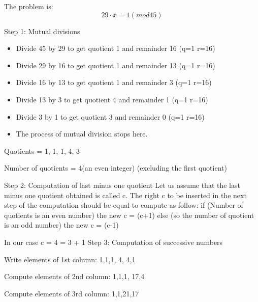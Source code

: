 \documentclass{article}
\begin{document}
The problem is: 
\[29 · x = 1 (mod 45)\]

Step 1: Mutual divisions
\begin{itemize}
    \item Divide 45 by 29 to get quotient 1 and remainder 16 (q=1 r=16)
    \item Divide 29 by 16 to get quotient 1 and remainder 13 (q=1 r=16)
    \item Divide 16 by 13 to get quotient 1 and remainder  3 (q=1 r=16)
    \item Divide 13 by  3 to get quotient 4 and remainder  1 (q=1 r=16)
    \item Divide  3 by  1 to get quotient 3 and remainder  0 (q=1 r=16)
    \item The process of mutual division stops here.
\end{itemize}

Quotients =  1, 1, 1, 4, 3

Number of quotients =  4(an even integer) (excluding the first quotient) \newline

Step 2: Computation of last minus one quotient
Let us assume that the last minus one quotient obtained is called c. The right c to be inserted in the next step of the computation should be equal to compute as follow:
if (Number of quotients is an even number)
  the new c = (c+1)
else (so the number of quotient is an odd number)
  the new c = (c-1)

In our case c = 4 = 3 + 1\newline\newline
Step 3: Computation of successive numbers

Write elements of 1st column\hspace*{10mm}:   1,\hspace*{5mm}1,\hspace*{5mm}1, \hspace*{5mm}4, \hspace*{5mm}4,\hspace*{5mm}1

Compute elements of 2nd column\hspace*{3.5mm}:   1,\hspace*{5mm}1,\hspace*{5mm}1,\hspace*{4mm} 17,\hspace*{5mm}4

Compute elements of 3rd column\hspace*{4mm}:   1,\hspace*{5mm}1,\hspace*{5mm}21,\hspace*{4mm}17      
\end{document}
